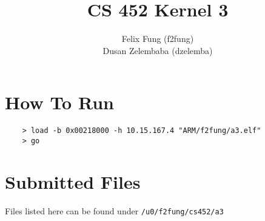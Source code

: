 \documentclass[letterpaper]{article}
\begin{document}
\title{CS 452 Kernel 3}
\author{Felix Fung (f2fung) \\ Dusan Zelembaba (dzelemba)}
\maketitle

\section{How To Run}
\begin{verbatim}
	> load -b 0x00218000 -h 10.15.167.4 "ARM/f2fung/a3.elf"
	> go
\end{verbatim}

\section{Submitted Files}

Files listed here can be found under \verb!/u0/f2fung/cs452/a3!
\end{document}
